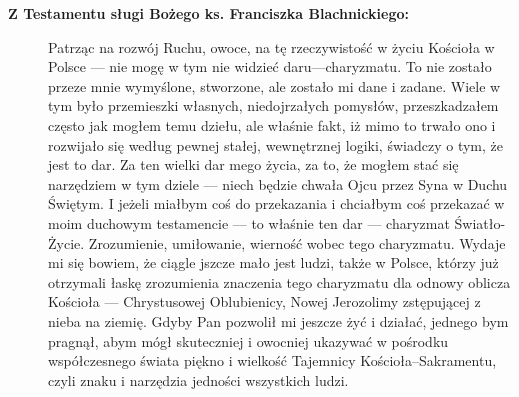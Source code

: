 \documentclass[a5paper,10pt,polish]{book}
\begin{document}
\begin{description}
\item[{\textbf{Z Testamentu sługi Bożego ks. Franciszka Blachnickiego:}}] \leavevmode
Patrząc na rozwój Ruchu, owoce, na tę rzeczywistość  w życiu Kościoła w Polsce  — nie mogę  w tym nie widzieć daru—charyzmatu. To nie zostało przeze mnie wymyślone, stworzone, ale zostało mi dane i zadane. Wiele w tym było przemieszki własnych, niedojrzałych pomysłów, przeszkadzałem często jak mogłem temu dziełu, ale właśnie fakt, iż mimo to trwało ono i rozwijało się według pewnej stałej, wewnętrznej logiki, świadczy o tym, że jest to dar.
Za ten wielki dar mego życia, za to, że  mogłem stać się narzędziem  w tym dziele — niech będzie chwała Ojcu przez Syna w Duchu Świętym.
I jeżeli  miałbym coś do przekazania  i chciałbym coś przekazać w moim duchowym testamencie — to właśnie ten dar — charyzmat Światło-Życie. Zrozumienie,  umiłowanie, wierność  wobec  tego  charyzmatu. Wydaje mi się bowiem, że ciągle  jszcze mało jest ludzi, także w Polsce, którzy już otrzymali łaskę zrozumienia  znaczenia tego charyzmatu dla odnowy oblicza Kościoła — Chrystusowej Oblubienicy, Nowej Jerozolimy zstępującej  z nieba na ziemię.
Gdyby Pan pozwolił mi jeszcze żyć i działać, jednego bym pragnął, abym mógł skuteczniej i owocniej ukazywać w pośrodku  współczesnego świata piękno i wielkość Tajemnicy Kościoła–Sakramentu, czyli znaku i narzędzia jedności wszystkich ludzi.

\end{description}



\renewcommand{\indexname}{Indeks}
\printindex
\end{document}
